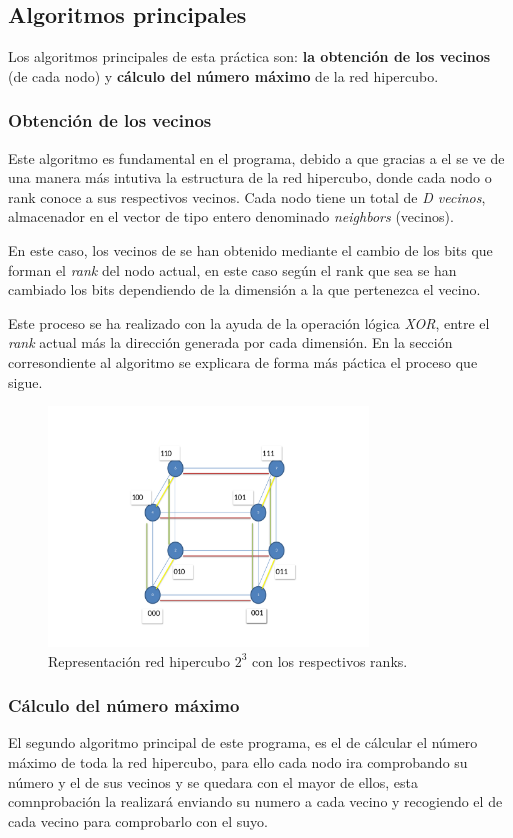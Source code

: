 \documentclass[11pt]{article}
\begin{document}
\subsection{Algoritmos principales}
Los algoritmos principales de esta práctica son: \textbf{la obtención de los vecinos} (de cada nodo) y \textbf{cálculo del número máximo} de la red hipercubo.

\subsubsection{Obtención de los vecinos}
Este algoritmo es fundamental en el programa, debido a que gracias a el se ve de una manera más intutiva la estructura de la red hipercubo, donde cada nodo o rank conoce a sus respectivos vecinos. Cada nodo tiene un total de \textit{D vecinos}, almacenador en el vector de tipo entero denominado \textit{neighbors} (vecinos).

En este caso, los vecinos de se han obtenido mediante el cambio de los bits que forman el \textit{rank} del nodo actual, en este caso según el rank que sea se han cambiado los bits dependiendo de la dimensión a la que pertenezca el vecino.

Este proceso se ha realizado con la ayuda de la operación lógica \textit{XOR}, entre el \textit{rank} actual más la dirección generada por cada dimensión.
En la sección corresondiente al algoritmo se explicara de forma más páctica el proceso que sigue.

\begin{figure}[H]
  \centering
    \includegraphics[width=85mm]{hipercubo.pdf}
  \caption{Representación red hipercubo $2^3$ con los respectivos ranks.}
  \label{fig:matriz}
\end{figure}


\subsubsection{Cálculo del número máximo}
El segundo algoritmo principal de este programa, es el de cálcular el número máximo de toda la red hipercubo, para ello cada nodo ira comprobando su número y el de sus vecinos y se quedara con el mayor de ellos, esta comnprobación la realizará enviando su numero a cada vecino y recogiendo el de cada vecino para comprobarlo con el suyo.
\end{document}
